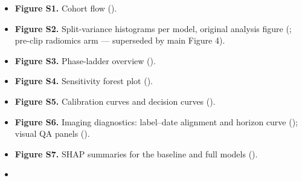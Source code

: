 \documentclass[11pt,a4paper]{article}
\begin{document}
\begin{itemize}
\item \textbf{Figure S1.} Cohort flow ().
\item \textbf{Figure S2.} Split-variance histograms per model, original analysis figure
(;
pre-clip radiomics arm --- superseded by
main Figure 4).
\item \textbf{Figure S3.} Phase-ladder overview
().
\item \textbf{Figure S4.} Sensitivity forest plot
().
\item \textbf{Figure S5.} Calibration curves and decision curves
().
\item \textbf{Figure S6.} Imaging diagnostics: label--date alignment and horizon curve
();
visual QA panels
().
\item \textbf{Figure S7.} SHAP summaries for the baseline and full models
().
\item {}
\end{itemize}

\FloatBarrier

\end{document}
